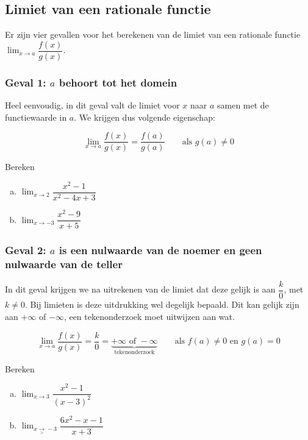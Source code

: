 \documentclass[12pt]{article}
\newenvironment{eigenschap}
{
  \vspace{0.4cm}
  \begin{mdframed}[nobreak=true,frametitle={Eigenschap}]
  }{%
  \end{mdframed}
}
\begin{document}
\subsection{Limiet van een rationale functie}

Er zijn vier gevallen voor het berekenen van de limiet van een rationale functie $\displaystyle\lim_{x\to a}\dfrac{f(x)}{g(x)}$.

\subsubsection*{Geval 1: $a$ behoort tot het domein}

Heel eenvoudig, in dit geval valt de limiet voor $x$ naar $a$ samen met de functiewaarde in $a$. We krijgen dus volgende eigenschap:

\begin{eigenschap}
  $$\lim_{x\to a}\dfrac{f(x)}{g(x)}=\dfrac{f(a)}{g(a)} \qquad \mbox{als $g(a)\neq 0$}$$
\end{eigenschap}

\begin{oefening}
  Bereken
  \begin{enumerate}[(a)]
  \item $\displaystyle\lim_{x\to2}\dfrac{x^2-1}{x^2-4x+3}$
  \item $\displaystyle\lim_{x\to-3}\dfrac{x^2-9}{x+5}$
  \end{enumerate}
\end{oefening}

\subsubsection*{Geval 2: $a$ is een nulwaarde van de noemer en geen nulwaarde van de teller}

In dit geval krijgen we na uitrekenen van de limiet dat deze gelijk is aan $\dfrac{k}{0}$, met $k\neq 0$. Bij limieten is deze uitdrukking wel degelijk bepaald. Dit kan gelijk zijn aan $+\infty$ of $-\infty$, een tekenonderzoek moet uitwijzen aan wat.

\begin{eigenschap}
  $$\lim_{x\to a}\dfrac{f(x)}{g(x)}=\dfrac{k}{0}=\underbrace{+\infty \mbox{ of } -\infty}_{\mbox{tekenonderzoek}} \qquad \mbox{als $f(a)\neq0$ en $g(a)=0$}$$
\end{eigenschap}

\begin{oefening}
  Bereken
  \begin{enumerate}[(a)]
  \item $\displaystyle\lim_{x\to3}\dfrac{x^2-1}{(x-3)^2}$
  \item $\displaystyle\lim_{x\underset{>}{\to}-3}\dfrac{6x^2-x-1}{x+3}$
  \end{enumerate}
\end{oefening}
\end{document}
